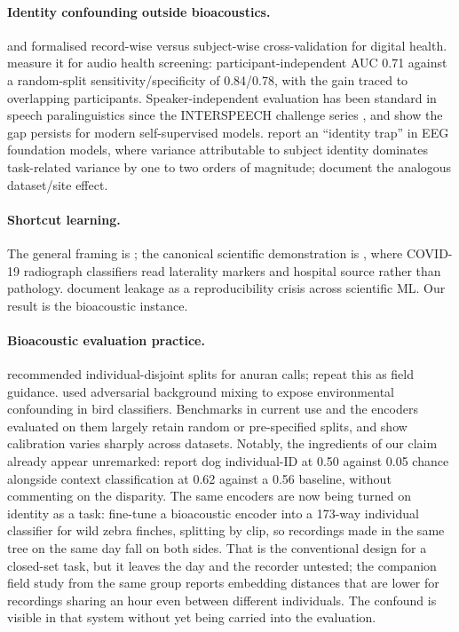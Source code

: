 \documentclass{article}
\begin{document}
\paragraph{Identity confounding outside bioacoustics.}
\citet{saeb2017} and \citet{chaibubneto2019} formalised record-wise versus subject-wise
cross-validation for digital health. \citet{han2022} measure it for audio health screening:
participant-independent AUC 0.71 against a random-split sensitivity/specificity of 0.84/0.78, with the
gain traced to overlapping participants. Speaker-independent evaluation has been standard in speech
paralinguistics since the INTERSPEECH challenge series \citep{schuller2009,schuller2010}, and
\citet{wagner2023} show the gap persists for modern self-supervised models. \citet{lin2026} report an
``identity trap'' in EEG foundation models, where variance attributable to subject identity dominates
task-related variance by one to two orders of magnitude; \citet{zare2026} document the analogous
dataset/site effect.

\paragraph{Shortcut learning.}
The general framing is \citet{geirhos2020}; the canonical scientific demonstration is
\citet{degrave2021}, where COVID-19 radiograph classifiers read laterality markers and hospital
source rather than pathology. \citet{kapoor2023} document leakage as a reproducibility crisis across
scientific ML. Our result is the bioacoustic instance.

\paragraph{Bioacoustic evaluation practice.}
\citet{colonna2016} recommended individual-disjoint splits for anuran calls; \citet{ghani2026} repeat
this as field guidance. \citet{stowell2019} used adversarial background mixing to expose
environmental confounding in bird classifiers. Benchmarks in current use \citep{hagiwara2023beans}
and the encoders evaluated on them \citep{hagiwara2023aves,miron2026avex} largely retain random or
pre-specified splits, and \citet{schwinger2026} show calibration varies sharply across datasets.
Notably, the ingredients of our claim already appear unremarked: \citet{abzaliev2024} report dog
individual-ID at 0.50 against 0.05 chance alongside context classification at 0.62 against a 0.56
baseline, without commenting on the disparity. The same encoders are now being turned on identity as
a task: \citet{chauhan2025} fine-tune a bioacoustic encoder into a 173-way individual classifier for
wild zebra finches, splitting by clip, so recordings made in the same tree on the same day fall on
both sides. That is the conventional design for a closed-set task, but it leaves the day and the
recorder untested; the companion field study from the same group \citep{hagedoorn2025} reports
embedding distances that are lower for recordings sharing an hour even between different individuals.
The confound is visible in that system without yet being carried into the evaluation.
\end{document}
